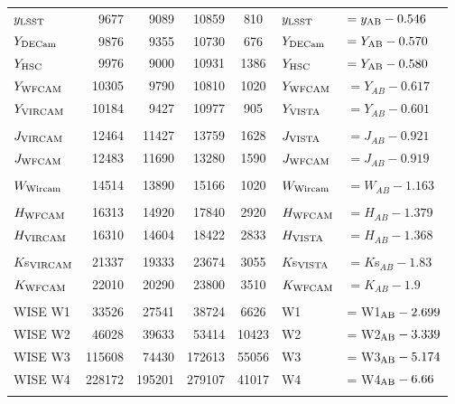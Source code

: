 \documentclass[usenatbib]{mnras}
\begin{document}
\begin{table*}
\begin{center}
\begin{tabular}{l r r r  c l l}
      $y_{\rm LSST}$      &       9677   &	 9089    &    10859  &     810         &  $y_{\rm LSST}  $      &$    = y_{\rm AB} - 0.546 $ \\
      $Y_{\rm DECam}$   &      9876   &	  9355    &      10730   &    676      &  $Y_{\rm DECam}  $   &$  =Y_{\rm AB} - 0.570 $ \\
      $Y_{\rm HSC}$       &      9976   &    9000    & 	10931  &   1386    &  $Y_{\rm HSC}  $   &$  =Y_{\rm AB} - 0.580 $ \\
      $Y_{\rm WFCAM}$    &   10305    &   9790      &   10810   &   1020     & $Y_{\rm WFCAM}$     &$ =  Y_{AB}  - 0.617$           \\
      $Y_{\rm VIRCAM}$     &    10184    &   9427      &   10977   &    905        & $Y_{\rm VISTA} $     &$ = Y_{AB}  - 0.601 $          \\
      &&&&&&\\
      $J_{\rm VIRCAM} $     &   12464   &      11427   &    13759   &  1628     &  $J_{\rm VISTA}  $     & $= J_{AB}    - 0.921  $         \\
      $J_{\rm WFCAM} $    &    12483   &     11690  &    13280   &   1590      & $J_{\rm WFCAM}$     & $= J_{AB}    - 0.919 $          \\
      &&&&&&\\
      $W_{\rm Wircam}$   &    14514    &    13890   &    15166   &   1020    & $W_{\rm Wircam} $    & $= W_{AB}  -  1.163$           \\
      &&&&&&\\
      $H_{\rm WFCAM}$    &    16313     &    14920  &    17840   &   2920    & $H_{\rm WFCAM} $   & $= H_{AB}  - 1.379$          \\
      $H_{\rm VIRCAM}$      &    16310    &    14604   &    18422   &   2833     & $H_{\rm VISTA}$      & $= H_{AB}  - 1.368 $        \\
      &&&&&&\\
      $K$s$_{\rm VIRCAM}$     &    21337    &    19333  &    23674   &   3055     & $K$s$_{\rm VISTA}$      & $ = K$s$_{AB} - 1.83  $          \\ 
      $K_{\rm WFCAM}$     &    22010     &    20290 &    23800   &   3510     & $K_{\rm WFCAM}$     & $ = K_{AB} - 1.9  $          \\ 
      &&&&&&\\
      WISE W1               &    33526    &    27541  &    38724   &    6626    & W1                        &   = W1$_{\rm AB} - 2.699$ \\
      WISE W2               &    46028    &    39633  &    53414   &  10423    & W2                        &   = W2$_{\rm AB} - 3.339$ \\
      WISE W3               &  115608    &    74430  &  172613   &  55056    & W3                        &   = W3$_{\rm AB} - 5.174$ \\
      WISE W4               &  228172    &  195201  &  279107   &  41017    & W4                        &   = W4$_{\rm AB} - 6.66$ \\
      \hline
      \hline
      \label{tab:filter_details}
    \end{tabular}
     \end{center}
\end{table*}
\end{document}
